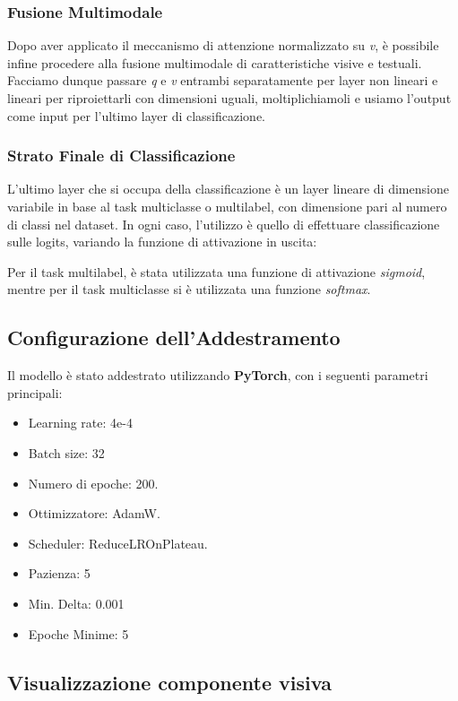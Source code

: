 \documentclass[../main.tex]{subfiles}
\begin{document}
\subsubsection{Fusione Multimodale}

Dopo aver applicato il meccanismo di attenzione normalizzato su \textit{v}, è possibile infine procedere alla fusione multimodale di caratteristiche visive e testuali.
Facciamo dunque passare \textit{q} e  \textit{v} entrambi separatamente per layer non lineari e lineari per riproiettarli con dimensioni uguali, moltiplichiamoli e usiamo l'output come input per l'ultimo layer di classificazione.

\subsubsection{Strato Finale di Classificazione}

L'ultimo layer che si occupa della classificazione è un layer lineare di dimensione variabile in base al task multiclasse o multilabel, con dimensione pari al numero di classi nel dataset. 
In ogni caso, l'utilizzo è quello di effettuare classificazione sulle logits, variando la funzione di attivazione in uscita:

Per il task multilabel, è stata utilizzata una funzione di attivazione \textit{sigmoid}, mentre per il task multiclasse si è utilizzata una funzione \textit{softmax}.

\subsection{Configurazione dell’Addestramento}

Il modello è stato addestrato utilizzando \textbf{PyTorch}, con i seguenti parametri principali:

\begin{itemize}
    \item Learning rate: 4e-4
    \item Batch size: 32
    \item Numero di epoche: 200.
    \item Ottimizzatore: AdamW.
    \item Scheduler: ReduceLROnPlateau.
    \item Pazienza: 5
    \item Min. Delta: 0.001
    \item Epoche Minime: 5
\end{itemize}

\subsection{Visualizzazione componente visiva}
\end{document}
